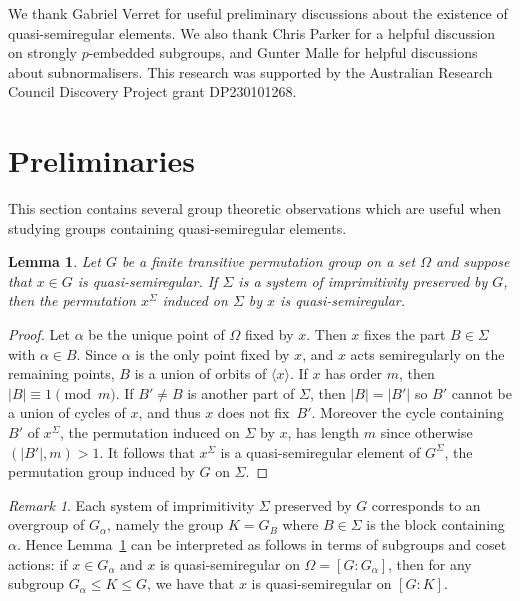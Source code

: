 \documentclass{article}
\newtheorem{lem}[thm]{Lemma}
\theoremstyle{remark}
\newtheorem{rem}[thm]{Remark}
\theoremstyle{definition}
\newcommand{\qsr}{quasi-semiregular}
\newcommand{\qsre}{quasi-semiregular element}
\newcommand{\qsres}{quasi-semiregular elements}
\begin{document}
 


\medskip

 \quad We thank Gabriel Verret for useful preliminary discussions about the existence of \qsres.  We also thank Chris Parker for a helpful discussion on  strongly  $p$-embedded subgroups, {   and Gunter Malle for helpful discussions about subnormalisers.}  This research was supported by the Australian Research Council Discovery Project grant DP230101268.  


\section{Preliminaries}

This section contains several group theoretic observations which are useful when studying groups containing {\qsres}.   

{  
\begin{lem}\label{lem:red to prim}
Let $G$ be a finite transitive permutation group on a set $\Omega$ and suppose that $x\in G$ is {\qsr}. If $\Sigma$ is a system of imprimitivity preserved by $G$, then the permutation $x^{\Sigma}$ induced on $\Sigma$ by $x$ is {\qsr}.
\end{lem}
\begin{proof}
     Let $\alpha$ be the unique point of $\Omega$ fixed by $x$. Then $x$ fixes the part $B\in \Sigma$ with $\alpha \in B$. Since $\alpha$ is the only point fixed by $x$, and $x$ acts semiregularly on the remaining points, $B$ is a union of orbits of $\langle x\rangle$. If $x$ has order $m$, then  $|B|\equiv 1 \pmod{m}$. If $B'\neq B$ is another part of $\Sigma$, then $|B|=|B'|$ so $B'$ cannot be a union of cycles of $x$, and thus $x$ does not fix~$B'$.   Moreover the cycle containing $B'$ of $x^\Sigma$, the permutation induced on $\Sigma$ by $x$,  has length $m$ since otherwise $(|B'|,m)>1$.  It follows that $x^\Sigma$ is a {\qsre} of $G^{\Sigma}$, the permutation group induced by $G$ on $\Sigma$. 
\end{proof}


\begin{rem}\label{rem: subs vs systs}
    Each system of imprimitivity $\Sigma$ preserved by $G$ corresponds to an overgroup of $G_\alpha$, namely the group $K=G_B$ where $B\in \Sigma$ is the block containing $\alpha$. Hence Lemma~\ref{lem:red to prim} can be interpreted as follows in terms of subgroups and coset actions: if $x\in G_\alpha$ and $x$ is {\qsr} on $\Omega=[G:G_\alpha]$, then for any subgroup $G_\alpha \leqslant K \leqslant G$, we have that $x$ is {\qsr} on $[G:K]$. 
\end{rem}
}
\end{document}
